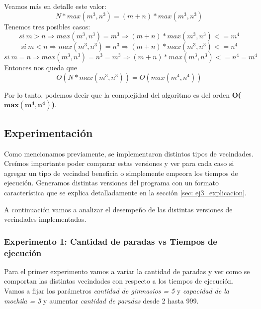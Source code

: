 Veamos más en detalle este valor:
\begin{equation}
  N * max(m^3, n^3) = (m+n) * max(m^3, n^3)
\end{equation}
Tenemos tres posibles casos:
\begin{equation}
  si\ m > n \Rightarrow max(m^3, n^3) = m^3 \Rightarrow (m+n) * max(m^3, n^3) <= m^4
\end{equation}
\begin{equation}
  si\ m < n \Rightarrow max(m^3, n^3) = n^3 \Rightarrow (m+n) * max(m^3, n^3) <= n^4
\end{equation}
\begin{equation}
  si\ m = n \Rightarrow max(m^3, n^3) = n^3 = m^3 \Rightarrow (m+n) * max(m^3, n^3) <= n^4 = m^4
\end{equation}
Entonces nos queda que
\begin{equation}
  O(N * max(m^3, n^3)) = O(max(m^4, n^4))
\end{equation}

Por lo tanto, podemos decir que la complejidad del algoritmo es del orden \textbf{O($\boldsymbol{max(m^4, n^4)}$)}.

\subsection{Experimentación}

\par Como mencionamos previamente, se implementaron distintos tipos de vecindades. Creímos importante poder comparar estas versiones y ver para cada caso si agregar un tipo de vecindad beneficia o simplemente empeora los tiempos de ejecución. Generamos distintas versiones del programa con un formato característica que se explica detalladamente en la sección \ref{sec: ej3_explicacion}.

\par A continuación vamos a analizar el desempeño de las distintas versiones de vecindades implementadas.

\subsubsection{Experimento 1: Cantidad de paradas vs Tiempos de ejecución}

\par Para el primer experimento vamos a variar la cantidad de paradas y ver como se comportan las distintas vecindades con respecto a los tiempos de ejecución. Vamos a fijar los parámetros \textit{cantidad de gimnasios = 5} y \textit{capacidad de la mochila = 5} y aumentar \textit{cantidad de paradas} desde 2 hasta 999.

